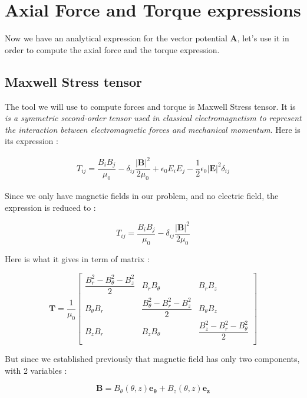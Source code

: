 \section{Axial Force and Torque expressions}

Now we have an analytical expression for the vector potential $\mathbf{A}$, let's use it in order to compute the axial force and the torque expression. 

\subsection*{Maxwell Stress tensor}

The tool we will use to compute forces and torque is Maxwell Stress tensor. It is \textit{ is a symmetric second-order tensor used in classical electromagnetism to represent the interaction between electromagnetic forces and mechanical momentum}. Here is its expression : 

\begin{align*}
T_{ij} = \dfrac{B_iB_j}{\mu_0} - \delta_{ij}\dfrac{|\mathbf{B}|^2}{2\mu_0} + \epsilon_0 E_i E_j - \dfrac{1}{2}\epsilon_0|\mathbf{E}|^2 \delta_{ij}
\end{align*}

Since we only have magnetic fields in our problem, and no electric field, the expression is reduced to :

\begin{equation*}
T_{ij} = \dfrac{B_iB_j}{\mu_0} - \delta_{ij}\dfrac{|\mathbf{B}|^2}{2\mu_0} 
\end{equation*}

Here is what it gives in term of matrix : 

\begin{equation*}
\mathbf{T} =  \dfrac{1}{\mu_0}
\begin{bmatrix}
\dfrac{B_r^2 - B_{\theta}^2 - B_z^2}{2} & B_rB_{\theta} & B_rB_z \\
B_{\theta}B_r & \dfrac{B_{\theta}^2 - B_r^2 - B_z^2}{2} & B_{\theta}B_z \\
B_zB_r & B_zB_{\theta} & \dfrac{B_z^2 - B_r^2 - B_{\theta}^2}{2}\\
\end{bmatrix}
\end{equation*}

But since we established previously that magnetic field has only two components, with 2 variables : 

\begin{equation*}
    \mathbf{B} = B_{\theta}(\theta,z)\mathbf{e_{\theta}}+B_z(\theta,z)\mathbf{e_z} 
\end{equation*}

